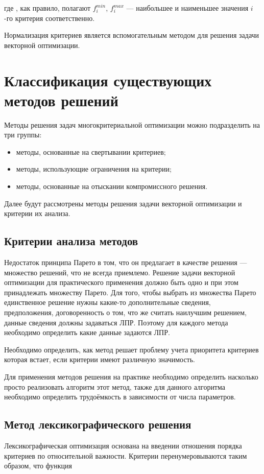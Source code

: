 \documentclass[a4paper,14pt]{report}
\begin{document}
где , как правило, полагают $f^{min}_i$, $f^{max}_i$ ---  наибольшее и наименьшее значения $i$-го критерия соответственно. 

Нормализация критериев является вспомогательным методом для решения задачи векторной оптимизации.  

\chapter{Классификация существующих методов решений}
Методы решения задач многокритериальной оптимизации можно подразделить на три группы:
\begin{itemize}
\item методы, основанные на свертывании критериев;

\item методы, использующие ограничения на критерии;

\item методы, основанные на отыскании компромиссного решения.
\end{itemize}
Далее будут рассмотрены методы решения задачи векторной оптимизации и критерии их анализа.

\section{Критерии анализа методов}
Недостаток принципа Парето в том, что он предлагает в качестве решения --- множество решений, что не всегда приемлемо. Решение задачи векторной оптимизации для практического применения должно быть одно и при этом принадлежать множеству Парето. Для того, чтобы выбрать из множества Парето единственное решение нужны какие-то дополнительные сведения, предположения, договоренность о том, что же считать наилучшим решением, данные сведения должны задаваться ЛПР. Поэтому для каждого метода необходимо определить какие данные задаются ЛПР.

Необходимо определить, как метод решает проблему учета приоритета критериев которая встает, если критерии имеют различную значимость. 

Для применения методов решения на практике необходимо определить насколько просто реализовать алгоритм этот метод, также для данного алгоритма необходимо определить трудоёмкость в зависимости от числа параметров.

\section{Метод лексикографического решения}
Лексикографическая оптимизация основана на введении отношения порядка критериев по относительной важности. Критерии перенумеровываются таким образом, что функция
\end{document}
